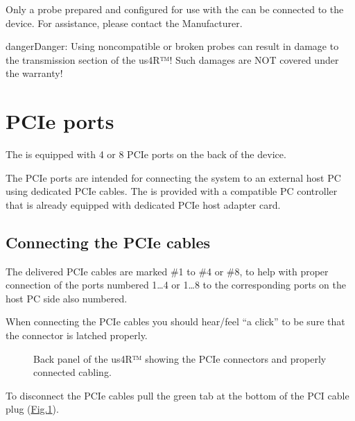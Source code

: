 \documentclass[letterpaper,10pt,english]{sphinxmanual}
\begin{document}
\sphinxAtStartPar
{} Only a probe prepared and configured for use with the  can be connected to the device. For assistance, please contact the Manufacturer.

\begin{sphinxadmonition}{danger}{Danger:}
\sphinxAtStartPar
Using non\sphinxhyphen{}compatible or broken probes can result in damage to the transmission section of the us4R™!
Such damages are NOT covered under the warranty!
\end{sphinxadmonition}


\section{PCIe ports}
\label{\detokenize{content/hardware:pcie-ports}}
\sphinxAtStartPar
The  is equipped with 4 or 8 PCIe ports on the back of the
device.

\sphinxAtStartPar
The PCIe ports are intended for connecting the system to an external
host PC using dedicated PCIe cables. The  is provided with a
compatible PC controller that is already equipped with dedicated PCIe
host adapter card.


\subsection{Connecting the PCIe cables}
\label{\detokenize{content/hardware:connecting-the-pcie-cables}}
\sphinxAtStartPar
The delivered PCIe cables are marked \#1 to \#4 or \#8, to help with proper
connection of the  ports numbered 1…4 or 1…8 to the
corresponding ports on the host PC side \textendash{} also numbered. 

\sphinxAtStartPar
When connecting the PCIe cables you should hear/feel “a click” to be
sure that the connector is latched properly.

\begin{figure}[htbp]
\centering
\capstart

\noindent{}
\caption{Back panel of the us4R™ showing the PCIe connectors and properly connected cabling.}\label{\detokenize{content/hardware:us4r-back-cables}}\end{figure}

\sphinxAtStartPar
To disconnect the PCIe cables pull the green tab at the bottom of the PCI cable plug (\hyperref[\detokenize{content/hardware:us4r-back-cables}]{Fig.\@ \ref{\detokenize{content/hardware:us4r-back-cables}}}).
\end{document}
